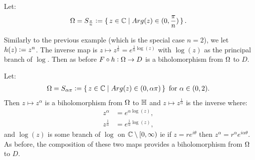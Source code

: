 \begin{example}
Let:
\begin{align*}
	\Omega = S_{\frac{\pi}{n}} \vcentcolon = \set{ z \in \mathbb{C}\mid Arg(z) \in (0, \frac{\pi}{n} ) }.
\end{align*}

\begin{center}
\end{center}

Similarly to the previous example (which is the special case $n=2$), we let $h(z) \vcentcolon = z^n$. The inverse map is $z \mapsto z^\frac{1}{n} = e^{\frac{1}{n} \log(z)}$ with $\log(z)$ as the principal branch of $\log$. Then as before $F \circ h : \Omega \to D$ is a biholomorphism from $\Omega$ to $D$.

\end{example}

\begin{example}
Let:
\begin{align*}
	\Omega = S_{\alpha \pi} \vcentcolon = \set{ z \in \mathbb{C}\mid Arg(z) \in (0, \alpha \pi ) } \text{ for } \alpha \in (0,2).
\end{align*}
Then $z \mapsto z^\alpha$ is a biholomorphism from $\Omega$ to $\mathbb{H}$ and $z \mapsto z^\frac{1}{\alpha}$ is the inverse where:
\begin{align*}
    z^\alpha &= e^{\alpha \log(z)},\\
    z^{\frac{1}{\alpha}} &= e^{ \frac{1}{\alpha} \log(z)},
\end{align*}
and $\log(z)$ is some branch of $\log$ on $\mathbb{C} \setminus [0, \infty)$ ie if $z = re^{i \theta}$ then $z^\alpha = r^\alpha e ^{i \alpha \theta}$. As before, the composition of these two maps provides a biholomorphism from $\Omega$ to $D$.
\end{example}

